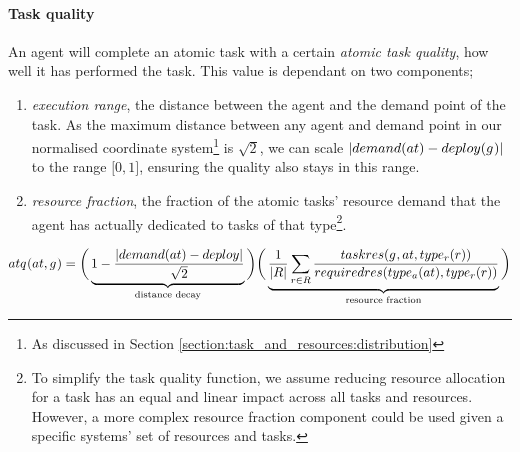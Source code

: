 \paragraph{Task quality}
\label{section:task_quality}
\newcommand{\functionAtomicTaskQualitySymbol}[2]{\functionSymbol{atq_{#1}^{#2}}}
\newcommand{\functionAtomicTaskQualitySignature}[2]{
	\ifx&#1&
	\functionSignature{\functionAtomicTaskQualitySymbol{}{}} {\varAtomicTask{}{}, \varAgent{}{}}
	\else
	\functionSignature{\functionAtomicTaskQualitySymbol{}{}}{#1, #2}
	\fi
}
\newcommand{\functionAtomicTaskQualitySensor}[2]{
	\functionSignature{\functionAtomicTaskQualitySymbol{}{}} {\varAtomicTask{}{}, \functionDetectorRole{}{}}
}

An agent will complete an atomic task with a certain \textit{atomic task quality}, how well it has performed the task. This value is dependant on two components;
\begin{enumerate}
	\item \textit{execution range}, the distance between the agent and the demand point of the task. As the maximum distance between any agent and demand point in our normalised coordinate system\footnote{As discussed in Section \ref{section:task_and_resources:distribution}} is $\sqrt{2}$, we can scale $\funcSize{ \functionTaskDemandPoint{}{} - \functionSignature{deploy}{\varAgent{}{}}}$ to the range $\lbrack 0, 1 \rbrack$, ensuring the quality also stays in this range.
	\item \textit{resource fraction}, the fraction of the atomic tasks' resource demand that the agent has actually dedicated to tasks of that type\footnote{To simplify the task quality function, we assume reducing resource allocation for a task has an equal and linear impact across all tasks and resources. However, a more complex resource fraction component could be used given a specific systems' set of resources and tasks.}.
\end{enumerate}

\begin{equation}
	\label{eq:atomic_task_quality}
	\functionAtomicTaskQualitySignature{}{} = 
\bigg (
\underbrace{
	1 - \frac{\funcSize{
			\functionTaskDemandPoint{}{} - \functionDeployment{}{} 
		}{}}{{\sqrt{2}}}
}_{\text{distance decay}}
\bigg )
\bigg (
\underbrace{
	\frac{1}{\funcSize{\setResource{}{}}}\sum_{\varResource{}{} \in \setResource{}{}} 
	\frac
	{\functionTaskResourceAllocationInstance{}{}}
	{\functionRequiredResourcesInstance{}{}}
}_{\text{resource fraction}}
\bigg )
\end{equation}


